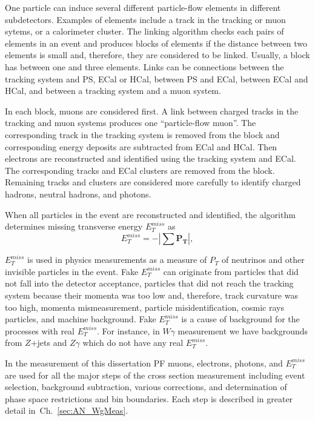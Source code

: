One particle can induce several different particle-flow elements in different subdetectors. Examples of elements include a track in the tracking or muon sytems, or a calorimeter cluster. The linking algorithm checks each pairs of elements in an event and produces blocks of elements if the distance between two elements is small and, therefore, they are considered to be linked. Usually, a block has between one and three elements. Links can be connections between the tracking system and PS, ECal or HCal, between PS and ECal, between ECal and HCal, and between a tracking system and a muon system. 

In each block, muons are considered first. A link between charged tracks in the tracking and muon systems produces one ``particle-flow muon''. The corresponding track in the tracking system is removed from the block and corresponding energy deposits are subtracted from ECal and HCal. Then electrons are reconstructed and identified using the tracking system and ECal. The corresponding tracks and ECal clusters are removed from the block. Remaining tracks and clusters are considered more carefully to identify charged hadrons, neutral hadrons, and photons.

When all particles in the event are reconstructed and identified, the algorithm determines missing transverse energy $E_T^{miss}$ as 
\begin{equation}\label{eq:MET}
  E_T^{miss} = - | \sum \mathbf{P_T} |,
\end{equation}

$E_T^{miss}$ is used in physics measurements as a measure of $P_T$ of neutrinos and other invisible particles in the event. Fake $E_T^{miss}$ can originate from particles that did not fall into the detector acceptance, particles that did not reach the tracking system because their momenta was too low and, therefore, track curvature was too high, momenta mismeasurement, particle misidentification, cosmic rays particles, and machine background. Fake $E_T^{miss}$ is a cause of background for the processes with real $E_T^{miss}$. For instance, in $W\gamma$ measurement we have backgrounds from $Z$+jets and $Z\gamma$ which do not have any real $E_T^{miss}$.

In the measurement of this dissertation PF muons, electrons, photons, and $E_T^{miss}$ are used for all the major steps of the cross section measurement including event selection, background subtraction, various corrections, and determination of phase space restrictions and bin boundaries. Each step is described in greater detail in~Ch.~\ref{sec:AN_WgMeas}. 


